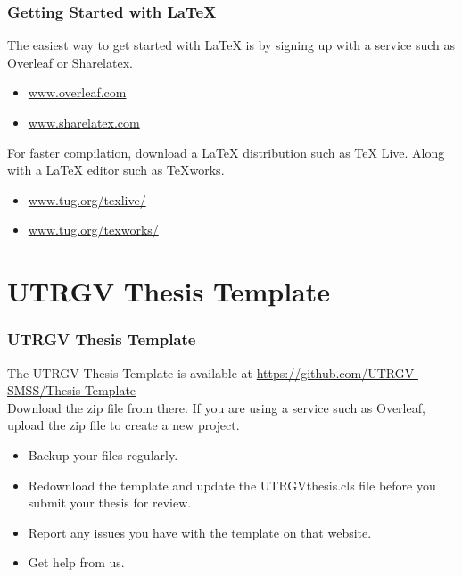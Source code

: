 \documentclass{beamer}
\begin{document}
\begin{frame}
\frametitle{Getting Started with \LaTeX}

  The easiest way to get started with \LaTeX{} is by signing up with a service
  such as Overleaf or Sharelatex.

  \begin{itemize}
    \item
      \href{http://www.overleaf.com}{www.overleaf.com}
    \item
      \href{http://www.sharelatex.com}{www.sharelatex.com}
  \end{itemize}

  For faster compilation, download a \LaTeX{} distribution such as TeX Live.
  Along with a \LaTeX{} editor such as TeXworks.
  \begin{itemize}
    \item
      \href{http://www.tug.org/texlive/}{www.tug.org/texlive/}
    \item
      \href{http://www.tug.org/texworks/}{www.tug.org/texworks/}
  \end{itemize}

\end{frame}


\section{UTRGV Thesis Template}
\begin{frame}
  \frametitle{UTRGV Thesis Template}
  The UTRGV Thesis Template is available at
  \url{https://github.com/UTRGV-SMSS/Thesis-Template}\\

  Download the zip file from there.  If you are using a service such
  as Overleaf,  upload the zip file to create a new project.

  \begin{itemize}
      \item
        Backup your files regularly.
      \item
        Redownload the template and update
        the UTRGVthesis.cls file before you submit your thesis for review.
      \item
        Report any issues you have with the template on that website.
      \item
        Get help from us.
  \end{itemize}

\end{frame}
\end{document}
